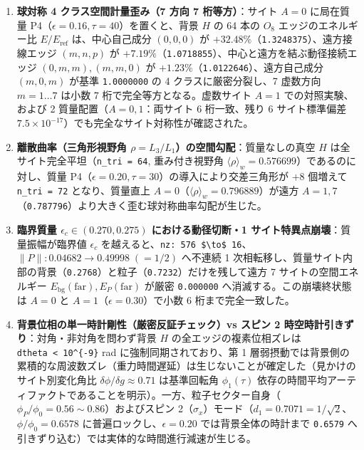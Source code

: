 \documentclass[
  a4paper,
]{ltjsarticle}
\providecommand{\tightlist}{%
  \setlength{\itemsep}{0pt}\setlength{\parskip}{0pt}}
\begin{document}
\begin{enumerate}
\def\labelenumi{\arabic{enumi}.}
\tightlist
\item
  \textbf{球対称 4 クラス空間計量歪み（7 方向 7 桁等方）}：サイト
  \(A = 0\) に局在質量
  P4（\(\epsilon = 0.16, \tau = 40\)）を置くと、背景 \(H\) の 64 本の
  \(O_8\) エッジのエネルギー比 \(E/E_{\mathrm{ref}}\) は、中心自己成分
  \((0,0,0)\) が \(+32.48\%\)（\texttt{1.3248375}）、遠方接線エッジ
  \((m,n,p)\) が
  \(+7.19\%\)（\texttt{1.0718855}）、中心と遠方を結ぶ動径接続エッジ
  \((0,m,m), (m,m,0)\) が
  \(+1.23\%\)（\texttt{1.0122646}）、遠方自己成分 \((m,0,m)\) が基準
  \texttt{1.0000000} の 4 クラスに厳密分裂し、7 虚数方向
  \(m = 1 \dots 7\) は小数 7 桁で完全等方となる。虚数サイト \(A = 1\)
  での対照実験、および 2 質量配置（\(A = 0, 1\)：両サイト 6 桁一致、残り
  6 サイト標準偏差
  \(7.5 \times 10^{-17}\)）でも完全なサイト対称性が確認された。
\item
  \textbf{離散曲率（三角形視野角
  \(\rho = L_3/L_1\)）の空間勾配}：質量なしの真空 \(H\)
  は全サイト完全平坦（\texttt{n\_tri\ =\ 64}, 重み付き視野角
  \(\langle\rho\rangle_w = 0.576699\)）であるのに対し、質量
  P4（\(\epsilon = 0.20, \tau = 30\)）の導入により交差三角形が \(+8\)
  個増えて \texttt{n\_tri\ =\ 72} となり、質量直上
  \(A = 0\)（\(\langle\rho\rangle_w = 0.796889\)）が遠方
  \(A = 1, 7\)（\texttt{0.787796}）より大きく歪む球対称曲率勾配が生じた。
\item
  \textbf{臨界質量 \(\epsilon_c \in (0.270, 0.275)\) における動径切断・1
  サイト特異点崩壊}：質量振幅が臨界値 \(\epsilon_c\)
  を越えると、\texttt{nz:\ 576\ \$\textbackslash{}to\$\ 16}、\(\|P\|: 0.04682 \to 0.49998\;(=1/2)\)
  へ不連続 1
  次相転移し、質量サイト内部の背景（\texttt{0.2768}）と粒子（\texttt{0.7232}）だけを残して遠方
  7 サイトの空間エネルギー
  \(E_{\mathrm{bg}}(\mathrm{far}), E_P(\mathrm{far})\) が厳密
  \texttt{0.000000} へ消滅する。この崩壊終状態は \(A = 0\) と
  \(A = 1\)（\(\epsilon = 0.30\)）で小数 6 桁まで完全一致した。
\item
  \textbf{背景位相の単一時計剛性（厳密反証チェック）vs スピン 2
  時空時計引きずり}：対角・非対角を問わず背景 \(H\)
  の全エッジの複素位相ズレは \texttt{dtheta\ \textless{}\ 10\^{}\{-9\}}
  rad に強制同期されており、第 1
  層弱摂動では背景側の累積的な周波数ズレ（重力時間遅延）は生じないことが確定した（見かけのサイト別変化角比
  \(\delta\phi/\delta g \approx 0.71\) は基準回転角 \(\phi_1(\tau)\)
  依存の時間平均アーティファクトであることを明示）。一方、粒子セクター自身（\(\phi_P/\phi_0 = 0.56 \sim 0.86\)）およびスピン
  2（\(\sigma_x\)）モード（\(d_1 = 0.7071 = 1/\sqrt{2}\)、\(\phi/\phi_0 = 0.6578\)
  に普遍ロックし、\(\epsilon = 0.20\) では背景全体の時計まで
  \texttt{0.6579} へ引きずり込む）では実体的な時間進行減速が生じる。
\end{enumerate}
\end{document}
